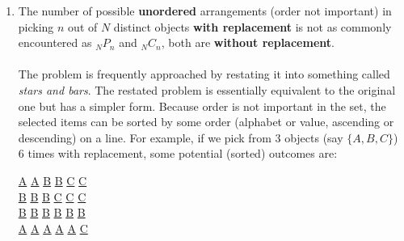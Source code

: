 \documentclass[12pt]{article}
\begin{document}
\begin{enumerate}
\item 
The number of possible \textbf{unordered} arrangements (order not important) in picking $n$ out of $N$ distinct objects \textbf{with replacement} is not as commonly encountered as $_N P_n$ and $_N C_n$, both are \textbf{without replacement}.
\\\\
The problem is frequently approached by restating it into something called \textit{stars and bars}. The restated problem is essentially equivalent to the original one but has a simpler form.
Because order is not important in the set, the selected items can be sorted by some order (alphabet or value, ascending or descending) on a line. 
For example, if we pick from $3$ objects (say $\{A,B,C\}$) $6$ times with replacement, some potential (sorted) outcomes are: 
\begin{center}
\underline{A} \quad \underline{A} \quad \underline{B} \quad \underline{B} \quad \underline{C} \quad \underline{C}   
\\
\underline{B} \quad \underline{B} \quad \underline{B} \quad \underline{C} \quad \underline{C} \quad \underline{C}
\\
\underline{B} \quad \underline{B} \quad \underline{B} \quad \underline{B} \quad \underline{B} \quad \underline{B}
\\
\underline{A} \quad \underline{A} \quad \underline{A} \quad \underline{A} \quad \underline{A} \quad \underline{C}
\end{center}


\end{enumerate}
\end{document}
